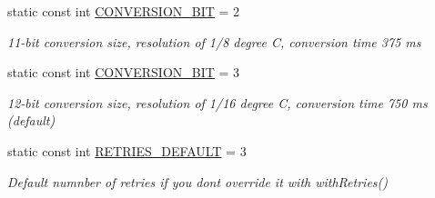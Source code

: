 \begin{DoxyCompactItemize}
\mbox{\label{class_d_s2482_command_a2eb8ba73273b26ee22700c8d48c1ab20}} 
static const int \mbox{\hyperlink{class_d_s2482_command_a2eb8ba73273b26ee22700c8d48c1ab20}{C\+O\+N\+V\+E\+R\+S\+I\+O\+N\+\_\+B\+IT}} = 2
\begin{DoxyCompactList}\small\item\em 11-\/bit conversion size, resolution of 1/8 degree C, conversion time 375 ms \end{DoxyCompactList}\item 
\mbox{\label{class_d_s2482_command_aa91ea7b3ce6822e580d0eb670f7be6e2}} 
static const int \mbox{\hyperlink{class_d_s2482_command_aa91ea7b3ce6822e580d0eb670f7be6e2}{C\+O\+N\+V\+E\+R\+S\+I\+O\+N\+\_\+B\+IT}} = 3
\begin{DoxyCompactList}\small\item\em 12-\/bit conversion size, resolution of 1/16 degree C, conversion time 750 ms (default) \end{DoxyCompactList}\item 
\mbox{\label{class_d_s2482_command_a0324b281b9bf9370c3f9763e325d4797}} 
static const int \mbox{\hyperlink{class_d_s2482_command_a0324b281b9bf9370c3f9763e325d4797}{R\+E\+T\+R\+I\+E\+S\+\_\+\+D\+E\+F\+A\+U\+LT}} = 3
\begin{DoxyCompactList}\small\item\em Default numnber of retries if you don\textquotesingle{}t override it with with\+Retries() \end{DoxyCompactList}\end{DoxyCompactItemize}

